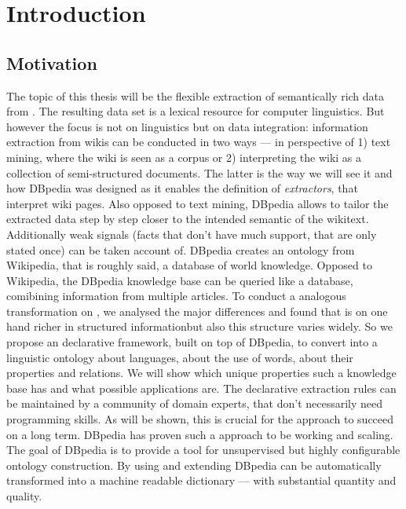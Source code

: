\section{Introduction}

\subsection{Motivation}

The topic of this thesis will be the flexible extraction of semantically rich data from \wik.
The resulting data set is a lexical resource for computer linguistics.
But however the focus is not on linguistics but on data integration: information extraction from wikis can be conducted in two ways --- in perspective of 1) text mining, where the wiki is seen as a corpus or 2) interpreting the wiki as a collection of semi-structured documents.
The latter is the way we will see it and how DBpedia was designed as it enables the definition of \textit{extractors}, that interpret wiki pages.
Also opposed to text mining, DBpedia allows to tailor the extracted data step by step closer to the intended semantic of the wikitext.
Additionally weak signals (facts that don't have much support, that are only stated once) can be taken account of.
DBpedia creates an ontology from Wikipedia, that is roughly said, a database of world knowledge.
Opposed to Wikipedia, the DBpedia knowledge base can be queried like a database, comibining information from multiple articles.
To conduct a analogous transformation on \wik, we analysed the major differences and found that \wik is on one hand richer in structured informationbut also  this structure varies widely.
So we propose an declarative framework, built on top of DBpedia, to convert \wik into a linguistic ontology about languages, about the use of words, about their properties and relations.
We will show which unique properties such a knowledge base has and what possible applications are.
The declarative extraction rules can be maintained by a community of domain experts, that don't necessarily need programming skills.
As will be shown, this is crucial for the approach to succeed on a long term.
DBpedia has proven such a approach to be working and scaling.
The goal of DBpedia is to provide a tool for unsupervised but highly configurable ontology construction.
By using and extending DBpedia \wik can be automatically transformed into a machine readable dictionary --- with substantial quantity and quality.


